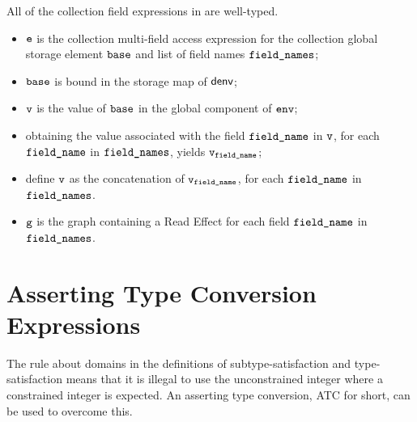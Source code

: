 
All of the collection field expressions in
 are well-typed.

\ProseParagraph
\AllApply
\begin{itemize}
  \item $\ve$ is the collection multi-field access expression for the
    collection global storage element $\vbase$ and list of field names
    $\vfieldnames$;
  \item $\vbase$ is bound in the storage map of $\denv$;
  \item $\vv$ is the value of $\vbase$ in the global component of $\env$;
  \item obtaining the value associated with the field $\fieldname$ in $\vv$,
    for each $\fieldname$ in $\vfieldnames$, yields $\vv_\fieldname$;
  \item define $\vv$ as the concatenation of $\vv_\fieldname$, for each
    $\fieldname$ in $\vfieldnames$.
  \item $\vg$ is the graph containing a Read Effect for each field $\fieldname$
    in $\vfieldnames$.
\end{itemize}

\FormallyParagraph
\begin{mathpar}
\end{mathpar}


\hypertarget{def-atceexpressionterm}{}
\section{Asserting Type Conversion Expressions\label{sec:AssertingTypeConversionExpressions}}
The rule about domains in the definitions of subtype-satisfaction and
type-satisfaction means that it is illegal to use the unconstrained integer
where a constrained integer is expected.
An asserting type conversion, ATC for short, can be used to overcome this.

